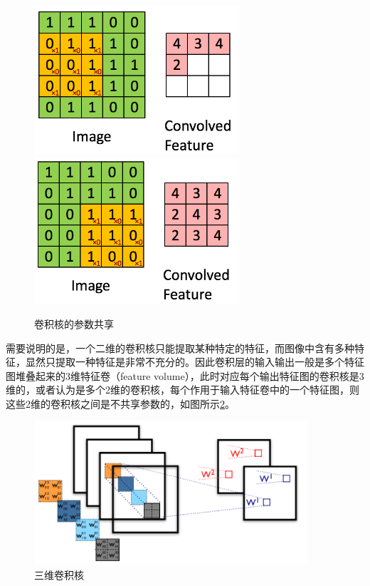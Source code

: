 \begin{figure}[htb] %
	\centering
	\includegraphics[width=3in]{figures/3_1_参数共享1}
	\includegraphics[width=3in]{figures/3_1_参数共享2}
	\caption{卷积核的参数共享} \label{fig:3_1_卷积核的参数共享}
\end{figure}

需要说明的是，一个二维的卷积核只能提取某种特定的特征，而图像中含有多种特征，显然只提取一种特征是非常不充分的。因此卷积层的输入输出一般是多个特征图堆叠起来的3维特征卷（feature volume），此时对应每个输出特征图的卷积核是3维的，或者认为是多个2维的卷积核，每个作用于输入特征卷中的一个特征图，则这些2维的卷积核之间是不共享参数的，如图所示\ref{fig:3_1_三维卷积核}。

\begin{figure}[htb] %
	\centering
	\includegraphics[width=4in]{figures/3_1_三维卷积核}
	\caption{三维卷积核} \label{fig:3_1_三维卷积核}
\end{figure}

